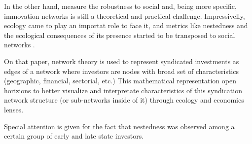 In the other hand, measure the robustness to social and, being more specific, innnovation networks is still a theoretical and practical challenge. Impressivelly, ecology came to play an importat role to face it, and metrics like nestedness and the ecological consequences of its presence started to be transposed to social networks \cite{Theophile2024}.

On that paper, network theory is used to represent syndicated investments as edges of a network where investors are nodes with broad set of characteristics (geographic, financial, sectorial, etc.) This mathematical representation open horizions to better visualize and interpretate characteristics of this syndication network structure (or sub-networks inside of it) through ecology and economics lenses. 

Special attention is given for the fact that nestedness was observed among a certain group of early and late state investors.

